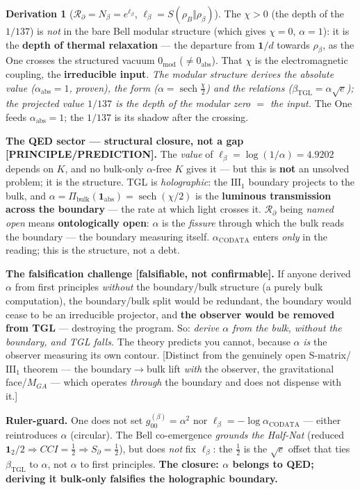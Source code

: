 \documentclass[11pt]{article}
\newcommand{\bTGL}{\beta_{\mathrm{TGL}}}\newcommand{\Msun}{M_{\odot}}\newcommand{\TGL}{\mathrm{TGL}}
\theoremstyle{definition}\newtheorem{deriv}{Derivation}
\begin{document}
\begin{deriv}[$\mathcal{R}_\partial=N_\beta=e^{\ell_\beta}$, $\ell_\beta=S(\rho_B\Vert\rho_\beta)$]
The $\chi>0$ (the depth of the $1/137$) is \emph{not} in the bare Bell modular structure (which gives $\chi=0$, $\alpha=1$): it is the \textbf{depth of thermal relaxation} --- the departure from $\mathbf 1/d$ towards $\rho_\beta$, as the One crosses the structured vacuum $0_{\mathrm{mod}}$ ($\neq 0_{\mathrm{abs}}$). That $\chi$ is the electromagnetic coupling, the \textbf{irreducible input}. \emph{The modular structure derives the absolute value ($\alpha_{\mathrm{abs}}=1$, proven), the form ($\alpha=\operatorname{sech}\tfrac\chi2$) and the relations ($\bTGL=\alpha\sqrt e$); the projected value $1/137$ is the depth of the modular zero $=$ the input.} The One feeds $\alpha_{\mathrm{abs}}=1$; the $1/137$ is its shadow after the crossing.

\textbf{The QED sector --- structural closure, not a gap \textsf{[PRINCIPLE/PREDICTION]}.} The \emph{value} of $\ell_\beta=\log(1/\alpha)=4.9202$ depends on $K$, and no bulk-only $\alpha$-free $K$ gives it --- but this is \textbf{not} an unsolved problem; it is the structure. TGL is \emph{holographic}: the $\mathrm{III}_1$ boundary projects to the bulk, and $\alpha=\Pi_{\mathrm{bulk}}(\mathbf 1_{\mathrm{abs}})=\operatorname{sech}(\chi/2)$ is the \textbf{luminous transmission across the boundary} --- the rate at which light crosses it. $\mathcal{R}_\partial$ being \emph{named open} means \textbf{ontologically open}: $\alpha$ is the \emph{fissure} through which the bulk reads the boundary --- the boundary measuring itself. $\alpha_{\mathrm{CODATA}}$ enters \emph{only} in the reading; this is the structure, not a debt.

\textbf{The falsification challenge \textsf{[falsifiable, not confirmable]}.} If anyone derived $\alpha$ from first principles \emph{without} the boundary/bulk structure (a purely bulk computation), the boundary/bulk split would be redundant, the boundary would cease to be an irreducible projector, and \textbf{the observer would be removed from TGL} --- destroying the program. So: \emph{derive $\alpha$ from the bulk, without the boundary, and TGL falls.} The theory predicts you cannot, because $\alpha$ \emph{is} the observer measuring its own contour. \textsf{[Distinct from the genuinely open S-matrix/$\mathrm{III}_1$ theorem --- the boundary$\to$bulk lift \emph{with} the observer, the gravitational face/$M_{GA}$ --- which operates \emph{through} the boundary and does not dispense with it.]}

\textbf{Ruler-guard.} One does not set $g_{00}^{(\beta)}=\alpha^2$ nor $\ell_\beta=-\log\alpha_{\mathrm{CODATA}}$ --- either reintroduces $\alpha$ (circular). The Bell co-emergence \emph{grounds the Half-Nat} (reduced $\mathbf 1_2/2\Rightarrow CCI=\tfrac12\Rightarrow S_\partial=\tfrac12$), but does \emph{not} fix $\ell_\beta$: the $\tfrac12$ is the $\sqrt e$ offset that ties $\bTGL$ to $\alpha$, not $\alpha$ to first principles. \textbf{The closure: $\alpha$ belongs to QED; deriving it bulk-only falsifies the holographic boundary.}\end{deriv}
\end{document}
